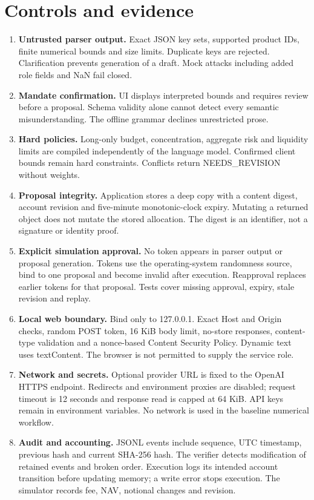 \documentclass[11pt,a4paper]{article}
\begin{document}
\section{Controls and evidence}
\begin{enumerate}
\item \textbf{Untrusted parser output.} Exact JSON key sets, supported product IDs, finite numerical bounds and size limits. Duplicate keys are rejected. Clarification prevents generation of a draft. Mock attacks including added role fields and NaN fail closed.
\item \textbf{Mandate confirmation.} UI displays interpreted bounds and requires review before a proposal. Schema validity alone cannot detect every semantic misunderstanding. The offline grammar declines unrestricted prose.
\item \textbf{Hard policies.} Long-only budget, concentration, aggregate risk and liquidity limits are compiled independently of the language model. Confirmed client bounds remain hard constraints. Conflicts return NEEDS\_REVISION without weights.
\item \textbf{Proposal integrity.} Application stores a deep copy with a content digest, account revision and five-minute monotonic-clock expiry. Mutating a returned object does not mutate the stored allocation. The digest is an identifier, not a signature or identity proof.
\item \textbf{Explicit simulation approval.} No token appears in parser output or proposal generation. Tokens use the operating-system randomness source, bind to one proposal and become invalid after execution. Reapproval replaces earlier tokens for that proposal. Tests cover missing approval, expiry, stale revision and replay.
\item \textbf{Local web boundary.} Bind only to 127.0.0.1. Exact Host and Origin checks, random POST token, 16 KiB body limit, no-store responses, content-type validation and a nonce-based Content Security Policy. Dynamic text uses textContent. The browser is not permitted to supply the service role.
\item \textbf{Network and secrets.} Optional provider URL is fixed to the OpenAI HTTPS endpoint. Redirects and environment proxies are disabled; request timeout is 12 seconds and response read is capped at 64 KiB. API keys remain in environment variables. No network is used in the baseline numerical workflow.
\item \textbf{Audit and accounting.} JSONL events include sequence, UTC timestamp, previous hash and current SHA-256 hash. The verifier detects modification of retained events and broken order. Execution logs its intended account transition before updating memory; a write error stops execution. The simulator records fee, NAV, notional changes and revision.
\end{enumerate}
\end{document}
